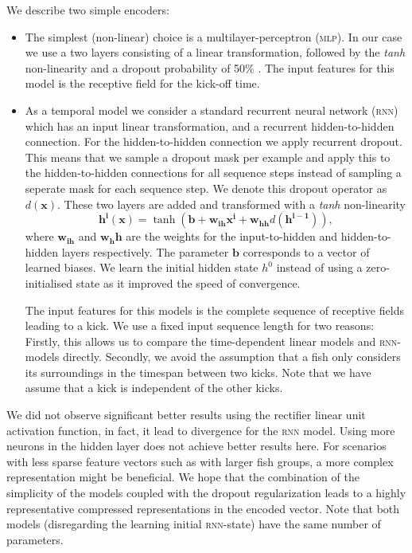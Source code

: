 \documentclass[nobib]{tufte-handout}
\begin{document}
We describe two simple encoders:
\begin{itemize}
\item The simplest (non-linear) choice is a multilayer-perceptron (\textsc{mlp}).
  In our case we use a two layers consisting of a linear transformation, followed by the \textit{tanh} non-linearity and a dropout probability of 50\%\autocite{dropout} .
  The input features for this model is the receptive field for the kick-off time.
\item
  As a temporal model we consider a standard recurrent neural network (\textsc{rnn}) which has an input linear transformation, and a recurrent hidden-to-hidden connection.
  For the hidden-to-hidden connection we apply recurrent dropout\autocite{recurrentDropout}.
  This means that we sample a dropout mask per example and apply this to the hidden-to-hidden connections for all sequence steps instead of sampling a seperate mask for each sequence step.
  We denote this dropout operator as \(d(\bm{x})\).
  These two layers are added and transformed with a \textit{tanh} non-linearity
  \begin{equation*}
    \bm{h^i} (\bm{x}) = \operatorname{tanh} \left( \bm{b} + \bm{w_{ih}} \bm{x^i} + \bm{w_{hh}} d (\bm{h^{i-1}}) \right),
  \end{equation*}
  where \(\bm{w_{ih}}\) and \(\bm{w_hh}\) are the weights for the input-to-hidden and hidden-to-hidden layers respectively.
  The parameter \(\bm{b}\) corresponds to a vector of learned biases.
  We learn the initial hidden state \(h^0\) instead of using a zero-initialised state as it improved the speed of convergence.

  The input features for this models is the complete sequence of receptive fields leading to a kick.
  We use a fixed input sequence length for two reasons:
  Firstly, this allows us to compare the time-dependent linear models and \textsc{rnn}-models directly.
  Secondly, we avoid the assumption that a fish only considers its surroundings in the timespan between two kicks.
  Note that we have assume that a kick is independent of the other kicks.
\end{itemize}
We did not observe significant better results using the rectifier linear unit activation function, in fact, it lead to divergence for the \textsc{rnn} model.
Using more neurons in the hidden layer does not achieve better results here.
For scenarios with less sparse feature vectors such as with larger fish groups, a more complex representation might be beneficial.
We hope that the combination of the simplicity of the models coupled with the dropout regularization leads to a highly representative compressed representations in the encoded vector.
Note that both models (disregarding the learning initial \textsc{rnn}-state) have the same number of parameters.
\end{document}
